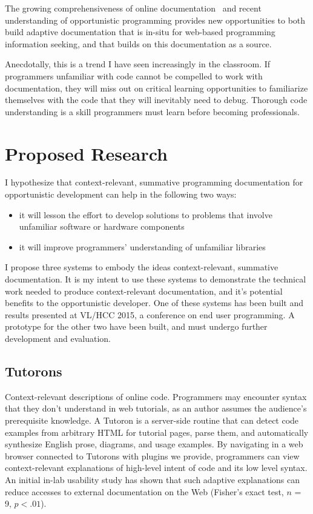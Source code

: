 \documentclass[12pt]{memoir}
\begin{document}
The growing comprehensiveness of online documentation~\cite{parnin_crowd_2012} and recent understanding of opportunistic programming provides new opportunities to both build adaptive documentation that is in-situ for web-based programming information seeking, and that builds on this documentation as a source.

Anecdotally, this is a trend I have seen increasingly in the classroom.
If programmers unfamiliar with code cannot be compelled to work with documentation, they will miss out on critical learning opportunities to familiarize themselves with the code that they will inevitably need to debug.
Thorough code understanding is a skill programmers must learn before becoming professionals.

\section{Proposed Research}

I hypothesize that context-relevant, summative programming documentation for opportunistic development can help in the following two ways:
\begin{itemize}[noitemsep]
\item it will lesson the effort to develop solutions to problems that involve unfamiliar software or hardware components
\item it will improve programmers' understanding of unfamiliar libraries
\end{itemize}

I propose three systems to embody the ideas context-relevant, summative documentation.  It is my intent to use these systems to demonstrate the technical work needed to produce context-relevant documentation, and it's potential benefits to the opportunistic developer.  One of these systems has been built and results presented at VL/HCC 2015, a conference on end user programming.  A prototype for the other two have been built, and must undergo further development and evaluation.

\subsection{Tutorons}
Context-relevant descriptions of online code.
Programmers may encounter syntax that they don't understand in web tutorials, as an author assumes the audience's prerequisite knowledge.
A Tutoron is a server-side routine that can detect code examples from arbitrary HTML for tutorial pages, parse them, and automatically synthesize English prose, diagrams, and usage examples.
By navigating in a web browser connected to Tutorons with plugins we provide, programmers can view context-relevant explanations of high-level intent of code and its low level syntax.
An initial in-lab usability study has shown that such adaptive explanations can reduce accesses to external documentation on the Web (Fisher's exact test, $n$ = 9, $p<.01$).
\end{document}
